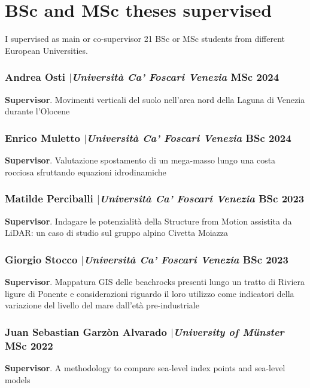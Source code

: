 \documentclass[11pt]{article}
\begin{document}
\section{BSc and MSc theses supervised}
{\normalfont I supervised as main or co-supervisor 21 BSc or MSc students from different European Universities.}\\

\subsubsection{Andrea Osti $|${\normalfont\textit{Università Ca' Foscari Venezia}} \hfill MSc 2024}
{\footnotesize 
\textbf{Supervisor}. Movimenti verticali del suolo nell’area nord della Laguna di Venezia durante l’Olocene}

\smallskip

\subsubsection{Enrico Muletto $|${\normalfont\textit{Università Ca' Foscari Venezia}} \hfill BSc 2024}
{\footnotesize 
\textbf{Supervisor}. Valutazione spostamento di un mega-masso lungo una costa rocciosa sfruttando equazioni idrodinamiche}

\smallskip

\subsubsection{Matilde Perciballi $|${\normalfont\textit{Università Ca' Foscari Venezia}} \hfill BSc 2023}
{\footnotesize 
\textbf{Supervisor}. Indagare le potenzialità della Structure from Motion assistita da LiDAR: un caso di studio sul gruppo alpino Civetta Moiazza}

\smallskip

\subsubsection{Giorgio Stocco $|${\normalfont\textit{Università Ca' Foscari Venezia}} \hfill BSc 2023}
{\footnotesize 
\textbf{Supervisor}. Mappatura GIS delle beachrocks presenti lungo un tratto di Riviera ligure di Ponente e considerazioni riguardo il loro utilizzo come indicatori della variazione del livello del mare dall’età pre-industriale}

\smallskip

\subsubsection{Juan Sebastian Garzòn Alvarado $|${\normalfont\textit{University of Münster}} \hfill MSc 2022}
{\footnotesize 
\textbf{Supervisor}. A methodology to compare sea-level index points and sea-level models}
\end{document}
